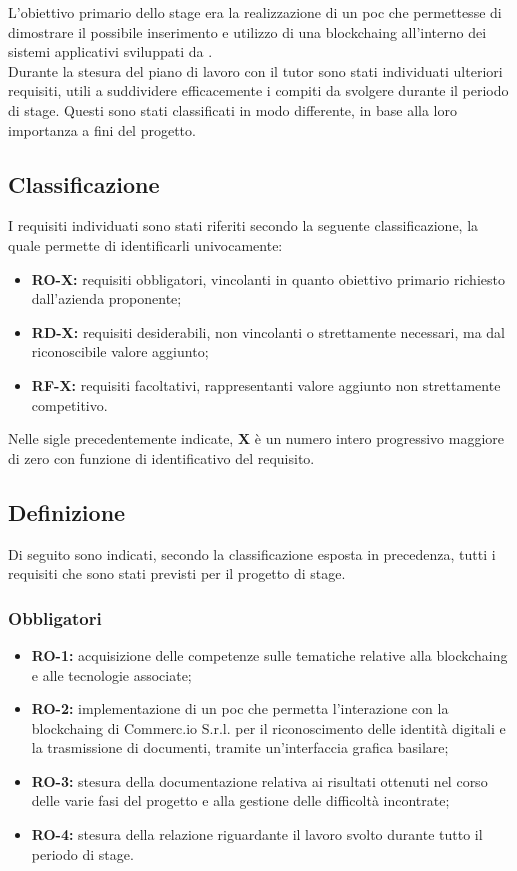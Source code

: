 L'obiettivo primario dello stage era la realizzazione di un \gls{poc} che permettesse di dimostrare il possibile inserimento e utilizzo di una \gls{blockchaing} all'interno dei sistemi applicativi sviluppati da \myCompany{} \companyTitle.\\
Durante la stesura del piano di lavoro con il tutor \myTutor sono stati individuati ulteriori requisiti, utili a suddividere efficacemente i compiti da svolgere durante il periodo di stage. Questi sono stati classificati in modo differente, in base alla loro importanza a fini del progetto.

\subsection{Classificazione}
I requisiti individuati sono stati riferiti secondo la seguente classificazione, la quale permette di identificarli univocamente:
\begin{itemize}
	\item \textbf{RO-X:} requisiti obbligatori, vincolanti in quanto obiettivo primario richiesto dall'azienda proponente;
	\item \textbf{RD-X:} requisiti desiderabili, non vincolanti o strettamente necessari, ma dal riconoscibile valore aggiunto;
	\item \textbf{RF-X:} requisiti facoltativi, rappresentanti valore aggiunto non strettamente competitivo.
\end{itemize}

Nelle sigle precedentemente indicate, \textbf{X} è un numero intero progressivo maggiore di zero con funzione di identificativo del requisito.

\subsection{Definizione}
Di seguito sono indicati, secondo la classificazione esposta in precedenza, tutti i requisiti che sono stati previsti per il progetto di stage.

\subsubsection*{Obbligatori}
\begin{itemize}
	\item \textbf{RO-1:} acquisizione delle competenze sulle tematiche relative alla \gls{blockchaing} e alle tecnologie associate;
	\item \textbf{RO-2:} implementazione di un \gls{poc} che permetta l'interazione con la \gls{blockchaing} di Commerc.io S.r.l. per il riconoscimento delle identità digitali e la trasmissione di documenti, tramite un'interfaccia grafica basilare;
	\item \textbf{RO-3:} stesura della documentazione relativa ai risultati ottenuti nel corso delle varie fasi del progetto e alla gestione delle difficoltà incontrate;
	\item \textbf{RO-4:} stesura della relazione riguardante il lavoro svolto durante tutto il periodo di stage.
\end{itemize}

